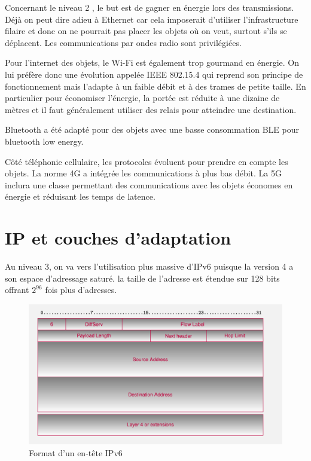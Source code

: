  Concernant le niveau 2 , le but est de gagner en énergie lors des transmissions. Déjà on peut dire adieu à Ethernet car cela imposerait d'utiliser l'infrastructure filaire et donc on ne pourrait pas placer les objets où on veut, surtout s'ils se déplacent. Les communications par ondes radio sont privilégiées. 
 
 Pour l'internet des objets, le Wi-Fi est également trop gourmand en énergie. On lui préfère donc une évolution appelée IEEE 802.15.4 qui reprend son principe de fonctionnement mais l'adapte à un faible débit et à des trames de petite taille. En particulier pour économiser l'énergie, la portée est réduite à une dizaine de mètres et il faut généralement utiliser des relais pour atteindre une destination. 
 
 Bluetooth a été adapté pour des objets avec une basse consommation BLE pour bluetooth low energy. 
     \vspace{1em}

 Côté téléphonie cellulaire, les protocoles évoluent pour prendre en compte les objets. La norme 4G a intégrée les communications à plus bas débit. La 5G inclura une classe permettant des communications avec les objets économes en énergie et réduisant les temps de latence. 
 
\section{IP et couches d'adaptation}

  Au niveau 3, on va vers l'utilisation plus massive d'IPv6 puisque la version 4 a son espace d'adressage saturé. la taille de l’adresse est étendue sur 128 bits offrant $2^{96}$ fois plus d’adresses.
  
  \begin{figure}[tbp]
\centerline{\includegraphics[width=1\columnwidth]{Pictures/Capture18.png}}
\caption{Format d'un en-tête IPv6}
\label{fig-IPv6-header}
\end{figure}

